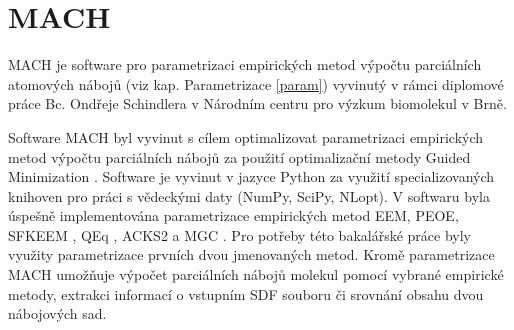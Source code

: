 \section{MACH}
MACH je software pro parametrizaci empirických metod výpočtu parciálních atomových nábojů (viz kap. Parametrizace \ref{param}) vyvinutý v rámci diplomové práce Bc. Ondřeje Schindlera v Národním centru pro výzkum biomolekul v Brně. 

Software MACH byl vyvinut s cílem optimalizovat parametrizaci empirických metod výpočtu parciálních nábojů za použití optimalizační metody Guided Minimization \cite{guided_m}. Software je vyvinut v jazyce Python za využití specializovaných knihoven pro práci s vědeckými daty (NumPy, SciPy, NLopt). V softwaru byla úspešně implementována parametrizace empirických metod EEM, PEOE, SFKEEM \cite{sfkeem}, QEq \cite{molsimul}, ACKS2 \cite{acsk2} a MGC \cite{mgc}. Pro potřeby této bakalářské práce byly využity parametrizace prvních dvou jmenovaných metod. Kromě parametrizace MACH umožňuje výpočet parciálních nábojů molekul pomocí vybrané empirické metody, extrakci informací o vstupním SDF souboru či srovnání obsahu dvou nábojových sad.
